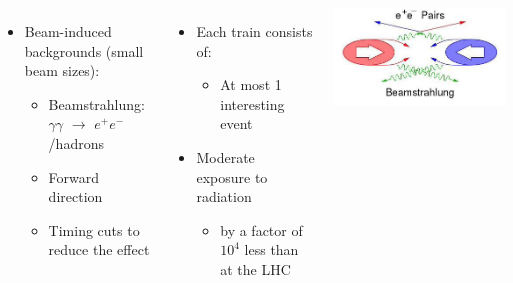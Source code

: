 \begin{frame}





\begin{columns}
  \begin{itemize}
  \item Beam-induced backgrounds (small beam sizes):
    \begin{itemize}
    \item Beamstrahlung: $\gamma\gamma$ $\rightarrow$
      $e^{+}e^{-}$/hadrons
    \item Forward direction
    \item Timing cuts to reduce the effect
    \end{itemize}
  \end{itemize}
  


  \begin{itemize}
  \item Each train consists of:
    \begin{itemize}
    \item At most 1 interesting event
    \end{itemize}
  \item Moderate exposure to radiation
    \begin{itemize} 
    \item by a factor of $10^4$ less than at the LHC
    \end{itemize}
  \end{itemize}

  \centering
  \includegraphics[width=\textwidth]{figures/beamstrahlung.png}
\end{columns}
\end{frame}


